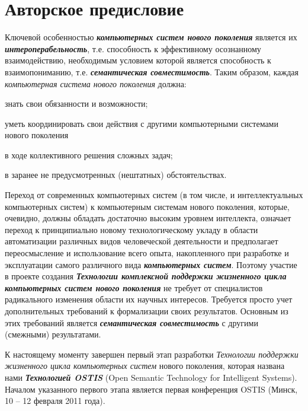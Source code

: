 
\chapter*{\LARGE Авторское предисловие}
\label{chap_preface_auth}

Ключевой особенностью \textbf{\textit{компьютерных систем нового поколения}} является их \textbf{\textit{интероперабельность}}, т.е. способность к эффективному осознанному взаимодействию, необходимым условием которой является способность к взаимопониманию, т.е. \textbf{\textit{семантическая совместимость}}. Таким образом, каждая \textit{компьютерная система нового поколения} должна:

\begin{textitemize}
	\item знать свои обязанности и возможности;
	\item уметь координировать свои действия с другими компьютерными системами нового поколения
	\begin{textitemize}
	\item в ходе коллективного решения сложных задач;
	\item в заранее не предусмотренных (нештатных) обстоятельствах.
	\end{textitemize}	
\end{textitemize}

Переход от современных компьютерных систем (в том числе, и интеллектуальных компьютерных систем) к компьютерным системам нового поколения, которые, очевидно, должны обладать достаточно высоким уровнем интеллекта, означает переход к принципиально новому технологическому укладу в области автоматизации различных видов человеческой деятельности и предполагает переосмысление и использование всего опыта, накопленного при разработке и эксплуатации самого различного вида \textbf{\textit{компьютерных систем}}. Поэтому участие в проекте создания \textbf{\textit{Технологии комплексной поддержки жизненного цикла компьютерных систем нового поколения}} не требует от специалистов радикального изменения области их научных интересов. Требуется просто учет дополнительных требований к формализации своих результатов. Основным из этих требований является \textbf{\textit{семантическая совместимость}} с другими (смежными) результатами.

К настоящему моменту завершен первый этап разработки \textit{Технологии поддержки жизненного цикла компьютерных систем} нового поколения, которая названа нами \textbf{\textit{Технологией OSTIS}} (Open Semantic Technology for Intelligent Systems). Началом указанного первого этапа является первая конференция OSTIS (Минск, 10 -- 12 февраля 2011 года).

